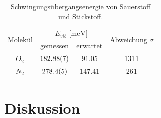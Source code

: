 \documentclass[11 pt]{article}
\begin{document}
\begin{table}[!htbp]
 \begin{center}
  \caption{ \small Schwingungsübergangsenergie von Sauerstoff und Stickstoff.}
  \label{tab:N_O}
  \renewcommand{\arraystretch}{1.3}
  \begin{tabular}{|c|c|c|c|}
  \hline

\multirow{2}{*}{Molekül}& \multicolumn{2}{c|}{$E_{vib}$ [$\unit{\milli\electronvolt}$]} &  \multirow{2}{*}{ Abweichung $\sigma$} \\ \cline{2-3} %
 					 & gemessen & erwartet &    			\\
  \hline
  \hline
  $O_2$	&	$\num{182.88 \pm 0.07}$	&	$\num{91.05}$ &	1311\\
  $N_2$	&	$\num{278.4 \pm 0.5}$	&	$\num{147.41}$&	261\\ 
  \hline
  \end{tabular}
  \renewcommand{\arraystretch}{1}
 \end{center}
\end{table}


\section{Diskussion}
\end{document}
